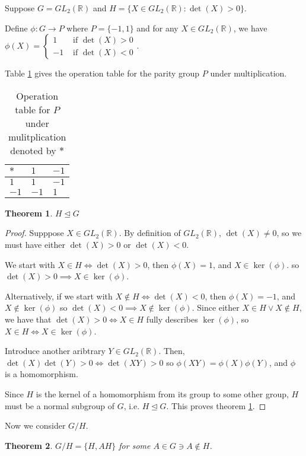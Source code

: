 \documentclass[12pt]{article}
\newcommand{\reals}{\mathbb{R}}
\newcommand{\gltwo}{GL_2(\reals)}
\newtheorem{thm}{Theorem}
\begin{document}
Suppose $G = \gltwo$ and $H = \{X \in \gltwo: \det(X) > 0\}$.

Define $\phi:G \to P$ where $P = \{-1,1\}$ and for any $X \in \gltwo$,
we have $\phi(X) = \begin{cases} 1 & \textrm{ if } \det(X) > 0 \\
				-1 & \textrm{ if } \det(X) < 0 \end{cases}$.

Table \ref{t5} gives the operation table
for the parity group $P$
under multiplication.

\begin{table}[!ht]
	\begin{tabular}{l|ll}
		$*$ & $1$ & $-1$ \\ \hline
		$1$ & $1$ & $-1$ \\
		$-1$ & $-1$ & $1$
	\end{tabular}
	\centering
	\caption{Operation table for $P$ under mulitplication denoted by $*$}
	\label{t5}
\end{table}

\begin{thm} \label{thm11}
	$H \trianglelefteq G$
\end{thm}

\begin{proof}
	Supppose $X \in \gltwo$.
	By definition of $\gltwo$,
	$\det(X) \neq 0$,
	so we must have either
	$\det(X) > 0$
	or $\det(X) < 0$.

	We start with $X \in H \iff \det(X) > 0$,
	then $\phi(X) = 1$,
	and $X \in \ker(\phi)$.
	so $\det(X) > 0 \implies X \in \ker(\phi)$.

	Alternatively,
	if we start with $X \not\in H \iff \det(X) < 0$, 
	then $\phi(X) = -1$,
	and $X \not\in \ker(\phi)$
	so $\det(X) < 0 \implies X \not\in \ker(\phi)$.
	Since either $X \in H \lor X \not\in H$,
	we have that $\det(X) > 0 \iff X \in H$
	fully describes $\ker(\phi)$,
	so $X \in H \iff X \in \ker(\phi)$.

	Introduce another aribtrary $Y \in \gltwo$.
	Then, $\det(X)\det(Y) > 0 \iff \det(XY) > 0$
	so $\phi(XY) = \phi(X)\phi(Y)$,
	and $\phi$ is a homomorphism.


	Since $H$ is the kernel of a homomorphism
	from its group to some other group,
	$H$ must be a normal subgroup of $G$,
	i.e. $H \trianglelefteq G$.
	This proves theorem \ref{thm11}.
\end{proof}

Now we consider $G/H$.


\begin{thm} \label{thm12}
	$G/H = \{H, AH\}$ for some $A \in G \ni A \not\in H$.
\end{thm}
\end{document}
